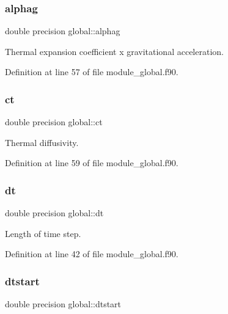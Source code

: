 \subsubsection{\texorpdfstring{alphag}{alphag}}
{\footnotesize\ttfamily double precision global\+::alphag}



Thermal expansion coefficient x gravitational acceleration. 



Definition at line 57 of file module\+\_\+global.\+f90.

\mbox{\label{namespaceglobal_acf5521de662915885b6a73718cd6314b}} 
\subsubsection{\texorpdfstring{ct}{ct}}
{\footnotesize\ttfamily double precision global\+::ct}



Thermal diffusivity. 



Definition at line 59 of file module\+\_\+global.\+f90.

\mbox{\label{namespaceglobal_a24d27ecfb0e7d422997122c9345bac8b}} 
\subsubsection{\texorpdfstring{dt}{dt}}
{\footnotesize\ttfamily double precision global\+::dt}



Length of time step. 



Definition at line 42 of file module\+\_\+global.\+f90.

\mbox{\label{namespaceglobal_a3c8fbc22da61f7188e79bad2b9ba1d16}} 
\subsubsection{\texorpdfstring{dtstart}{dtstart}}
{\footnotesize\ttfamily double precision global\+::dtstart}



